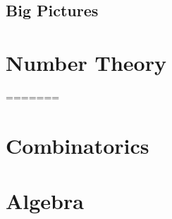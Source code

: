 \documentclass[a4paper, 12pt, oneside]{memoir}
\begin{document}
\section{Big Pictures}



\chapter{Number Theory}
\thispagestyle{empty}











\printindex[prob]
\printindex[thm]
\printindex[def]
\printindex[strat]
\printindex
=======
 \maketitle\vfill \thispagestyle{empty}\newpage
 
 \begingroup{\hypersetup{hidelinks}\tableofcontents}\thispagestyle{empty}\endgroup
 \setcounter{page}{0}


 
 



 \chapter{Combinatorics}
 \thispagestyle{empty}

 
 
 
 
 
 
 
 
 
 
 
 
 
 	
 


 \chapter{Algebra}
 \thispagestyle{empty}

 
 
 
 
 
 
\end{document}
